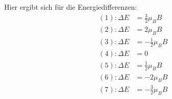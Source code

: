             Hier ergibt sich für die Energiedifferenzen:
            \begin{align}
                (1): \Delta E&=\frac{3}{2}\mu_BB \\
                (2): \Delta E&=2\mu_BB \\
                (3): \Delta E&=-\frac{1}{2}\mu_BB \\
                (4): \Delta E&=0 \\
                (5): \Delta E&=\frac{1}{2}\mu_BB \\
                (6): \Delta E&=-2\mu_BB \\
                (7): \Delta E&=-\frac{3}{2}\mu_BB
            \end{align}